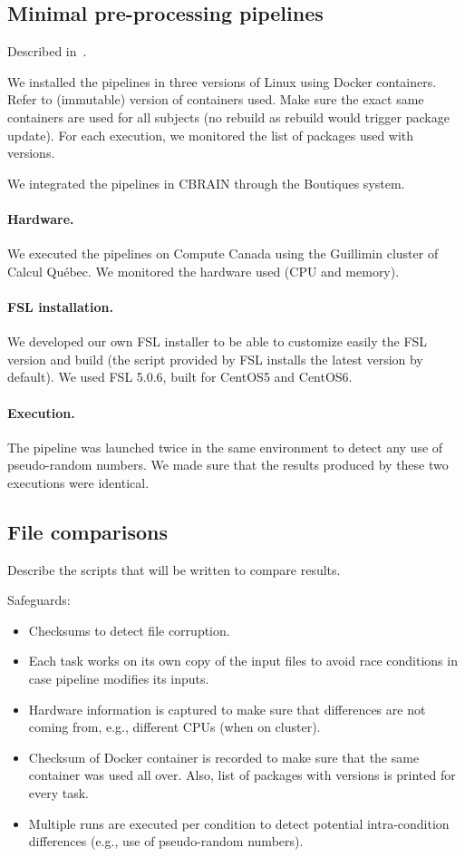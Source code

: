 \documentclass{article}
\begin{document}
\subsection{Minimal pre-processing pipelines}

Described in~\cite{glasser2013minimal}.

We installed the pipelines in three versions of Linux using Docker
containers. Refer to (immutable) version of containers used. Make sure
the exact same containers are used for all subjects (no rebuild as
rebuild would trigger package update). For each execution, we
monitored the list of packages used with versions.

We integrated the pipelines in CBRAIN through the Boutiques system.

\paragraph{Hardware.} We executed the pipelines on Compute Canada
using the Guillimin cluster of Calcul Qu\'ebec. We monitored the
hardware used (CPU and memory). 

\paragraph{FSL installation.} We developed our own FSL installer to be
able to customize easily the FSL version and build (the script
provided by FSL installs the latest version by default). We used FSL
5.0.6, built for CentOS5 and CentOS6.

\paragraph{Execution.} The pipeline was launched twice in the same
environment to detect any use of pseudo-random numbers. We
made sure that the results produced by these two executions were
identical.

\subsection{File comparisons}

Describe the scripts that will be written to compare results.

Safeguards:
\begin{itemize}
\item Checksums to detect file corruption.
\item Each task works on its own copy of the input files to avoid race conditions in case pipeline modifies its inputs.
\item Hardware information is captured to make sure that differences are not coming from, e.g., different CPUs (when on cluster).
\item Checksum of Docker container is recorded to make sure that the same container was used all over. Also, list of packages with versions is printed for every task. 
\item Multiple runs are executed per condition to detect potential intra-condition differences (e.g., use of pseudo-random numbers).
\end{itemize}
\end{document}
